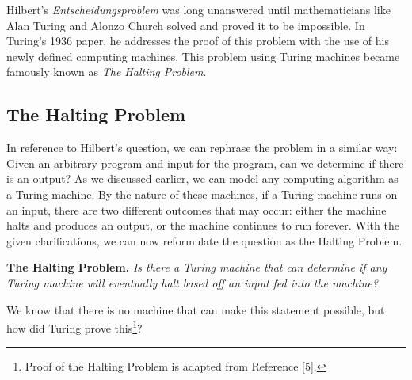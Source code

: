 \documentclass[12pt]{article}
\begin{document}
 Hilbert's \textit{Entscheidungsproblem} was long unanswered until mathematicians like Alan Turing and Alonzo Church solved and proved it to be impossible. In Turing's 1936 paper, he addresses the proof of this problem with the use of his newly defined computing machines. This problem using Turing machines became famously known as \textit{The Halting Problem}.

\subsection{The Halting Problem}

In reference to Hilbert's question, we can rephrase the problem in a similar way: Given an arbitrary program and input for the program, can we determine if there is an output? As we discussed earlier, we can model any computing algorithm as a Turing machine. By the nature of these machines, if a Turing machine runs on an input, there are two different outcomes that may occur: either the machine halts and produces an output, or the machine continues to run forever. With the given clarifications, we can now reformulate the question as the Halting Problem.\newline

\noindent \textbf{The Halting Problem.} \textit{Is there a Turing machine that can determine if any Turing machine will eventually halt based off an input fed into the machine?}\newline

\noindent We know that there is no machine that can make this statement possible, but how did Turing prove this\footnote{Proof of the Halting Problem is adapted from Reference [5].}?
\end{document}
